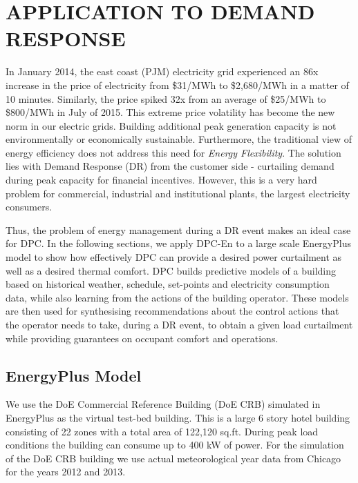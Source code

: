 \section{APPLICATION TO DEMAND RESPONSE}
\label{S:casestudy}

In January 2014, the east coast (PJM) electricity grid experienced an 86x increase in the price of electricity from \$31/MWh to \$2,680/MWh in a matter of 10 minutes. Similarly, the price spiked 32x from an average of \$25/MWh to \$800/MWh in July of 2015. This extreme price volatility has become the new norm in our electric grids. Building additional peak generation capacity is not environmentally or economically sustainable. Furthermore, the traditional view of energy efficiency does not address this need for \emph{Energy Flexibility}. The solution lies with Demand Response (DR) from the customer side - curtailing demand during peak capacity for financial incentives. However, this is a very hard problem for commercial, industrial and institutional plants, the largest electricity consumers.

Thus, the problem of energy management during a DR event makes an ideal case for DPC. In the following sections, we apply DPC-En to a large scale EnergyPlus model to show how effectively DPC can provide a desired power curtailment as well as a desired thermal comfort. DPC builds predictive models of a building based on historical weather, schedule, set-points and electricity consumption data, while also learning from the actions of the building operator. These models are then used for synthesising recommendations about the control actions that the operator needs to take, during a DR event, to obtain a given load curtailment while providing guarantees on occupant comfort and operations.

\subsection{EnergyPlus Model}
We use the DoE Commercial Reference Building (DoE CRB) simulated in EnergyPlus \cite{Deru2011} as the virtual test-bed building.
This is a large 6 story hotel building consisting of 22 zones with a total area of 122,120 sq.ft. 
During peak load conditions the building can consume up to 400 kW of power. 
For the simulation of the DoE CRB building we use actual meteorological year data from Chicago for the years 2012 and 2013. 

